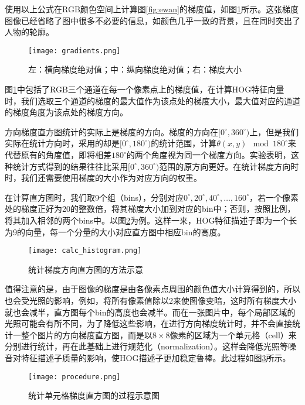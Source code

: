   使用以上公式在RGB颜色空间上计算图\ref{fig:ewan}的梯度值，如图\ref{fig:gradients}所示。这张梯度图像已经省略了图中很多不必要的信息，如颜色几乎一致的背景，且在同时突出了人物的轮廓。

\begin{figure}[htb]
  \centering
  \texttt{[image: gradients.png]}
  \caption{左：横向梯度绝对值；中：纵向梯度绝对值；右：梯度大小}
  \label{fig:gradients}
\end{figure}

  图\ref{fig:gradients}中包括了RGB三个通道在每一个像素点上的梯度值，在计算HOG特征向量时，我们选取三个通道的梯度的最大值作为该点处的梯度大小，最大值对应的通道的梯度角度为该点处的梯度方向。

  方向梯度直方图统计的实际上是梯度的方向。梯度的方向在$[0^{\circ},360^{\circ})$上，但是我们实际在统计方向时，采用的却是$[0^{\circ},180^{\circ})$的统计范围，计算$\theta(x,y) \mod 180^{\circ}$来代替原有的角度值，即将相差$180^{\circ}$的两个角度视为同一个梯度方向。实验表明，这种统计方式得到的结果往往比采用$[0^{\circ},360^{\circ})$范围的原方向更好\cite{dalal2005histograms}。在统计梯度方向时时，我们还需要使用梯度的大小作为对应方向的权重。

  在计算直方图时，我们取9个组（bins），分别对应$0^{\circ},20^{\circ},40^{\circ},\dots,160^{\circ}$，若一个像素处的梯度正好为20的整数倍，将其梯度大小加到对应的bin中；否则，按照比例，将其加入相邻的两个bins中。以图\ref{fig:distribute}为例。这样一来，HOG特征描述子即为一个长为9的向量，每一个分量的大小对应直方图中相应bin的高度。

\begin{figure}[htb]
  \centering
  \texttt{[image: calc\_histogram.png]}
  \caption{统计梯度方向直方图的方法示意}
  \label{fig:distribute}
\end{figure}

  值得注意的是，由于图像的梯度是由各像素点周围的颜色值大小计算得到的，所以也会受光照的影响，例如，将所有像素值除以2来使图像变暗，这时所有梯度大小就也会减半，直方图每个bin的高度也会减半。而在一张图片中，每个局部区域的光照可能会有所不同，为了降低这些影响，在进行方向梯度统计时，并不会直接统计一整个图片的方向梯度直方图，而是以$8\times8$像素的区域为一个单元格（cell）来分别进行统计，再在此基础上进行规范化（normalization）。这样会降低光照等噪音对特征描述子质量的影响，使HOG描述子更加稳定鲁棒。此过程如图\ref{fig:procedure}所示。

\begin{figure}[htb]
  \centering
  \texttt{[image: procedure.png]}
  \caption{统计单元格梯度直方图的过程示意图}
  \label{fig:procedure}
\end{figure}

